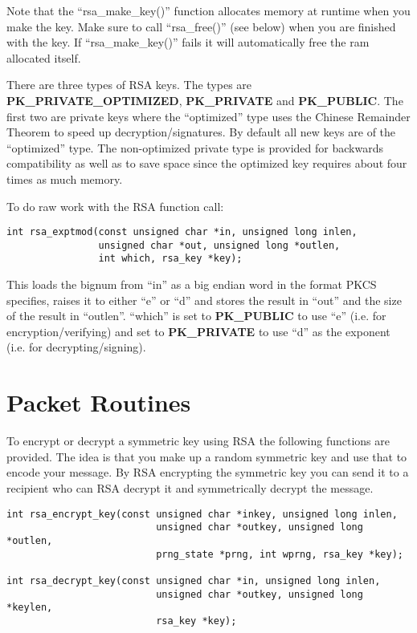 \documentclass{book}
\begin{document}
Note that the ``rsa\_make\_key()'' function allocates memory at runtime when you make the key.  Make sure to call 
``rsa\_free()'' (see below) when you are finished with the key.  If ``rsa\_make\_key()'' fails it will automatically 
free the ram allocated itself.

There are three types of RSA keys.  The types are {\bf PK\_PRIVATE\_OPTIMIZED}, {\bf PK\_PRIVATE} and {\bf PK\_PUBLIC}.  The first
two are private keys where the ``optimized'' type uses the Chinese Remainder Theorem to speed up decryption/signatures.  By 
default all new keys are of the ``optimized'' type.  The non-optimized private type is provided for backwards compatibility
as well as to save space since the optimized key requires about four times as much memory.

To do raw work with the RSA function call:
\begin{verbatim}
int rsa_exptmod(const unsigned char *in, unsigned long inlen, 
                unsigned char *out, unsigned long *outlen, 
                int which, rsa_key *key);
\end{verbatim}
This loads the bignum from ``in'' as a big endian word in the format PKCS specifies, raises it to either ``e'' or ``d'' and stores the result
in ``out'' and the size of the result in ``outlen''. ``which'' is set to {\bf PK\_PUBLIC} to use ``e'' 
(i.e. for encryption/verifying) and set to {\bf PK\_PRIVATE} to use ``d'' as the exponent (i.e. for decrypting/signing).

\section{Packet Routines}
To encrypt or decrypt a symmetric key using RSA the following functions are provided.  The idea is that you make up
a random symmetric key and use that to encode your message.  By RSA encrypting the symmetric key you can send it to a
recipient who can RSA decrypt it and symmetrically decrypt the message.
\begin{verbatim}
int rsa_encrypt_key(const unsigned char *inkey, unsigned long inlen,
                          unsigned char *outkey, unsigned long *outlen,
                          prng_state *prng, int wprng, rsa_key *key);

int rsa_decrypt_key(const unsigned char *in, unsigned long inlen, 
                          unsigned char *outkey, unsigned long *keylen, 
                          rsa_key *key);
\end{verbatim}
\end{document}
